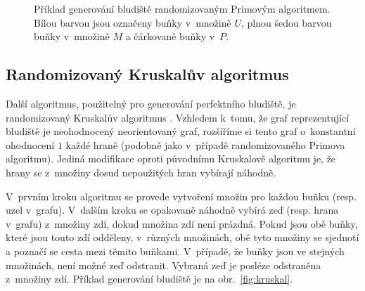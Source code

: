 \documentclass[a4paper,12pt]{article}
\begin{document}
\begin{figure}[h]
\begin{center}
  \end{center}
  \caption{Příklad generování bludiště randomizovaným Primovým algoritmem. Bílou barvou jsou označeny buňky v~množině $U$, plnou šedou barvou buňky v~množině $M$ a
  čárkovaně buňky v~$P$.}
  \label{fig:prim}
\end{figure}
 
\subsection{Randomizovaný Kruskalův algoritmus}
Další algoritmus, použitelný pro generování perfektního bludiště, je randomizovaný Kruskalův algoritmus \cite{fol}. Vzhledem k~tomu, že 
graf reprezentující bludiště je neohodnocený neorientovaný graf, rozšíříme si tento graf o~konstantní ohodnocení $1$ každé hraně (podobně jako
v~případě randomizovaného Primova algoritmu). Jediná modifikace oproti původnímu Kruskalově algoritmu je, že hrany se z~množiny dosud nepoužitých hran
vybírají náhodně.

V~prvním kroku algoritmu se provede vytvoření množin pro každou buňku (resp. uzel v~grafu). V~dalším kroku se opakovaně náhodně vybírá zeď (resp. hrana v~grafu) 
z~množiny zdí, dokud množina zdí není prázdná. Pokud jsou obě buňky, které jsou touto zdí odděleny, v~různých množinách, obě tyto množiny se sjednotí a 
poznačí se cesta mezi těmito buňkami. V~případě, že buňky jsou ve stejných množinách, není možné zeď odstranit. Vybraná zeď je posléze odstraněna z~množiny zdí.
Příklad generování bludiště je na obr.~\ref{fig:kruskal}.
\end{document}
